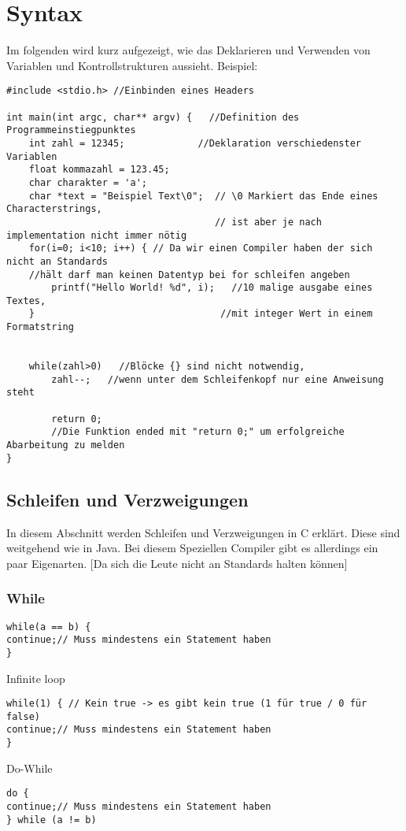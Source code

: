 \documentclass{article}
\begin{document}
\section{Syntax}
Im folgenden wird kurz aufgezeigt, wie das Deklarieren und Verwenden von Variablen und Kontrollstrukturen aussieht. Beispiel:
\newpage
\begin{verbatim}
#include <stdio.h> //Einbinden eines Headers

int main(int argc, char** argv) {	//Definition des Programmeinstiegpunktes
    int zahl = 12345;             //Deklaration verschiedenster Variablen
    float kommazahl = 123.45;      	
    char charakter = 'a';
    char *text = "Beispiel Text\0";  // \0 Markiert das Ende eines Characterstrings,
                                     // ist aber je nach implementation nicht immer nötig
    for(i=0; i<10; i++) { // Da wir einen Compiler haben der sich nicht an Standards 
    //hält darf man keinen Datentyp bei for schleifen angeben
        printf("Hello World! %d", i);	//10 malige ausgabe eines Textes,
    }                                 //mit integer Wert in einem Formatstring
    
	
    while(zahl>0)	//Blöcke {} sind nicht notwendig,
        zahl--;   //wenn unter dem Schleifenkopf nur eine Anweisung steht
		
	    return 0; 
	    //Die Funktion ended mit "return 0;" um erfolgreiche Abarbeitung zu melden
}
\end{verbatim}

\subsection{Schleifen und Verzweigungen}
In diesem Abschnitt werden Schleifen und Verzweigungen in C erklärt. Diese sind weitgehend wie in Java. Bei diesem Speziellen Compiler gibt es allerdings ein paar Eigenarten. [Da sich die Leute nicht an Standards halten können]
\subsubsection*{While}
\begin{verbatim}
while(a == b) {
continue;// Muss mindestens ein Statement haben
}
\end{verbatim}
Infinite loop
\begin{verbatim}
while(1) { // Kein true -> es gibt kein true (1 für true / 0 für false)
continue;// Muss mindestens ein Statement haben
}
\end{verbatim}
Do-While
\begin{verbatim}
do {
continue;// Muss mindestens ein Statement haben
} while (a != b)
\end{verbatim}
\end{document}

